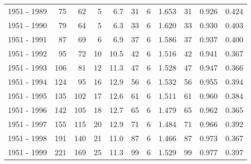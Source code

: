 \begin{tabular}{lrrrrrrrrrr}
1951 - 1989 &       75 &       62 &                 5 &               6.7 &                      31 &                          6 &       1.653 &             31 &       0.926 &             0.424 \\
1951 - 1990 &       79 &       64 &                 5 &               6.3 &                      33 &                          6 &       1.620 &             33 &       0.930 &             0.403 \\
1951 - 1991 &       87 &       69 &                 6 &               6.9 &                      37 &                          6 &       1.586 &             37 &       0.937 &             0.400 \\
1951 - 1992 &       95 &       72 &                10 &              10.5 &                      42 &                          6 &       1.516 &             42 &       0.941 &             0.367 \\
1951 - 1993 &      106 &       81 &                12 &              11.3 &                      47 &                          6 &       1.528 &             47 &       0.947 &             0.366 \\
1951 - 1994 &      124 &       95 &                16 &              12.9 &                      56 &                          6 &       1.532 &             56 &       0.955 &             0.394 \\
1951 - 1995 &      135 &      102 &                17 &              12.6 &                      61 &                          6 &       1.511 &             61 &       0.960 &             0.384 \\
1951 - 1996 &      142 &      105 &                18 &              12.7 &                      65 &                          6 &       1.479 &             65 &       0.962 &             0.365 \\
1951 - 1997 &      155 &      115 &                20 &              12.9 &                      71 &                          6 &       1.484 &             71 &       0.966 &             0.392 \\
1951 - 1998 &      191 &      140 &                21 &              11.0 &                      87 &                          6 &       1.466 &             87 &       0.973 &             0.367 \\
1951 - 1999 &      221 &      169 &                25 &              11.3 &                      99 &                          6 &       1.529 &             99 &       0.977 &             0.397 \\

\end{tabular}
